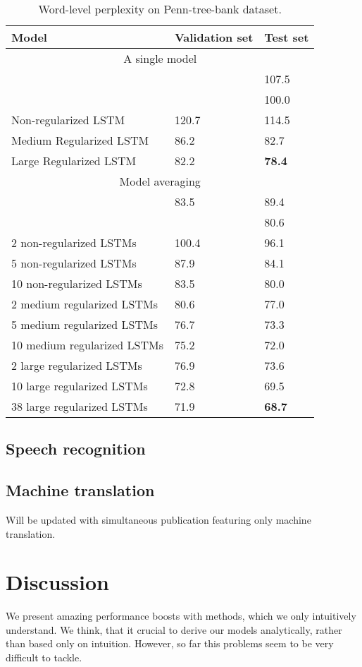 \documentclass{article}
\begin{document}
\begin{table}[t]
  \small
  \centering
  \renewcommand{\arraystretch}{1.15}
  \begin{tabular}{lll}
    \hline
     Model & Validation set & Test set \\
    \hline
    \multicolumn{3}{c}{A single model} \\
    \hline
    \cite{pascanu2013construct} & & 107.5 \\
    \cite{chenglanguage} & & 100.0 \\
    Non-regularized LSTM & 120.7 & 114.5 \\
    Medium Regularized LSTM & 86.2 & 82.7 \\
    Large Regularized LSTM & 82.2 & {\bf 78.4} \\
    \hline
    \multicolumn{3}{c}{Model averaging} \\
    \hline
    \cite{mikolov2012statistical} & 83.5 & 89.4 \\
    \cite{chenglanguage} & & 80.6 \\
    2 non-regularized LSTMs & 100.4 & 96.1 \\
    5 non-regularized LSTMs & 87.9 & 84.1 \\
    10 non-regularized LSTMs & 83.5 & 80.0 \\
    2 medium regularized LSTMs & 80.6 & 77.0 \\
    5 medium regularized LSTMs & 76.7 & 73.3 \\
    10 medium regularized LSTMs & 75.2 & 72.0 \\
    2 large regularized LSTMs & 76.9 & 73.6 \\
    10 large regularized LSTMs & 72.8 & 69.5 \\
    38 large regularized LSTMs & 71.9 & {\bf 68.7} \\
    \hline
  \end{tabular}
  \caption{Word-level perplexity on Penn-tree-bank dataset.}
  \label{tab:ptb}
\end{table}

\subsection{Speech recognition}
\label{sec:speech}

\subsection{Machine translation}
\label{sec:trans}
Will be updated with simultaneous publication featuring only machine translation.

\section{Discussion}
We present amazing performance boosts with methods, which we 
only intuitively understand. We think, that it crucial
to derive our models analytically, rather than based only on
intuition. However, so far this problems seem to be very difficult to
tackle.




\end{document}
